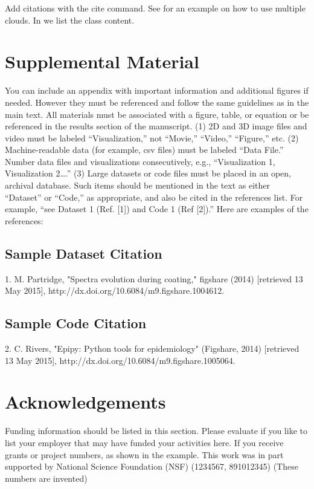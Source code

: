 \documentclass[9pt,twocolumn,twoside]{styles/osajnl}
\begin{document}
\noindent Add citations with the cite command. See
\cite{las14cloudmeshmultiple} for an example on how to use multiple
clouds. In \cite{www-i524} we list the class content.

\section{Supplemental Material}

You can include an appendix with important information and additional
figures if needed. However they must be referenced and follow the same
guidelines as in the main text.  All materials must be associated with
a figure, table, or equation or be referenced in the results section
of the manuscript.  (1) 2D and 3D image files and video must be
labeled “Visualization,” not “Movie,” “Video,” “Figure,” etc.  (2)
Machine-readable data (for example, csv files) must be labeled “Data
File.”  Number data files and visualizations consecutively, e.g.,
“Visualization 1, Visualization 2….”  (3) Large datasets or code files
must be placed in an open, archival database.  Such items should be
mentioned in the text as either “Dataset” or “Code,” as appropriate,
and also be cited in the references list.  For example, “see Dataset 1
(Ref. [1]) and Code 1 (Ref [2]).” Here are examples of the references:

\subsection{Sample Dataset Citation}

1. M. Partridge, "Spectra evolution during coating," figshare (2014) [retrieved 13 May 2015], http://dx.doi.org/10.6084/m9.figshare.1004612.

\subsection{Sample Code Citation}

2. C. Rivers, "Epipy: Python tools for epidemiology" (Figshare, 2014) [retrieved 13 May 2015], http://dx.doi.org/10.6084/m9.figshare.1005064.


\section*{Acknowledgements}

Funding information should be listed in this section. Please evaluate
if you like to list your employer that may have funded your activities
here.  If you receive grants or project numbers, as shown in the
example.  This work was in part supported by National Science
Foundation (NSF) (1234567, 891012345) (These numbers are invented)
\end{document}
